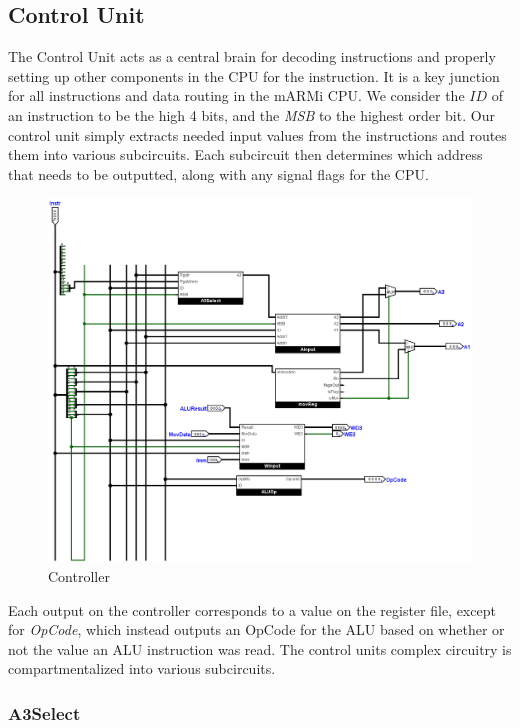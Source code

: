 \documentclass[12pt, letter]{article}
\begin{document}
	\subsection{Control Unit}
	The Control Unit acts as a central brain for decoding instructions and properly setting up other components in the CPU for the instruction. It is a key junction for all instructions and data routing in the mARMi CPU. We consider the $ID$ of an instruction to be the high 4 bits, and the \textit{MSB} to the highest order bit. Our control unit simply extracts needed input values from the instructions and routes them into various subcircuits. Each subcircuit then determines which address that needs to be outputted, along with any signal flags for the CPU.
	
	\begin{figure}[h]
		\centering
		\includegraphics[scale = 0.2]{Controller}
		\caption{Controller}
		\label{fig:Controller}
	\end{figure}

	Each output on the controller corresponds to a value on the register file, except for \textit{OpCode}, which instead outputs an OpCode for the ALU based on whether or not the value an ALU instruction was read. The control units complex circuitry is compartmentalized into various subcircuits.
	
	\subsubsection{A3Select}
	
\end{document}
